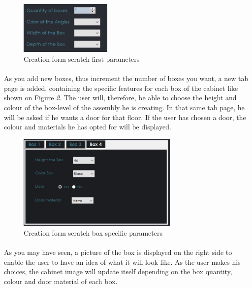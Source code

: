 \documentclass[12pt,oneside]{report}
\begin{document}
            \begin{figure}[h!]
                \centering
    			\includegraphics[width = 0.4\textwidth]{Figures/CommonBoxFeatures.PNG}
                \caption{Creation form scratch first parameters}
                \label{fig:CommonBoxFeatures}
            \end{figure}
            
            \paragraph{}
            As you add new boxes, thus increment the number of boxes you want, a new tab page is added, containing the specific features for each box of the cabinet like shown on Figure \textit{\ref{fig:creationTabPage}}. The user will, therefore, be able to choose the height and colour of the box-level of the assembly he is creating. In that same tab page, he will be asked if he wants a door for that floor. If the user has chosen a door, the colour and materials he has opted for will be displayed. 
            \vspace{\baselineskip}
            \begin{figure}[h!]
                \centering
    			\includegraphics[width = 0.7\textwidth]{Figures/CreationTabPages.PNG}
                \caption{Creation form scratch box specific parameters}
                \label{fig:creationTabPage}
            \end{figure}
            
            \paragraph{}
            As you may have seen, a picture of the box is displayed on the right side to enable the user to have an idea of what it will look like. As the user makes his choices, the cabinet image will update itself depending on the box quantity, colour and door material of each box. 
            
\end{document}
